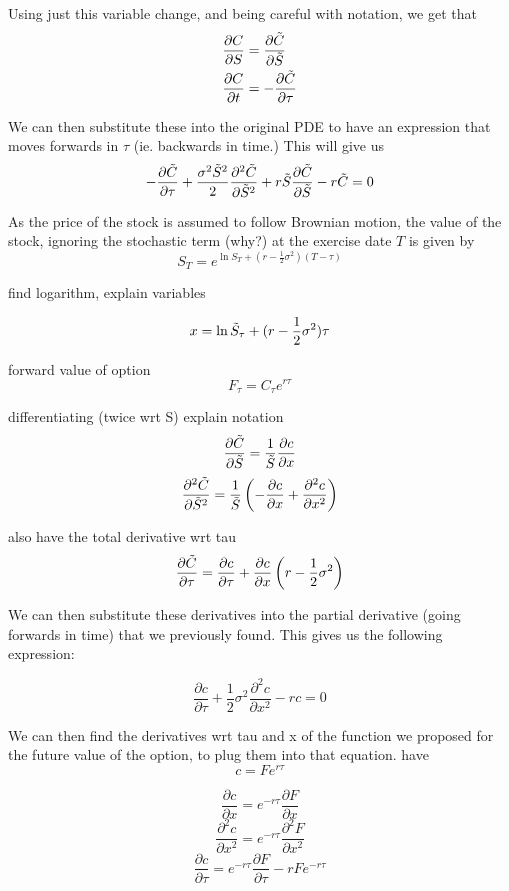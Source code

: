 \documentclass[11pt]{article}
\begin{document}
Using just this variable change, and being careful with notation, we get that
\begin{align*}
    \frac{\partial C}{\partial S} &= \frac{\partial \Tilde{C}}{\partial \Tilde{S}} \\
    \frac{\partial C}{\partial t} &= -\frac{\partial \Tilde{C}}{\partial \tau}
\end{align*}

We can then substitute these into the original PDE to have an expression that moves forwards in $\tau$ (ie. backwards in time.) This will give us
\[
- \frac{\partial \Tilde{C}}{\partial \tau} + \frac{\sigma^2 \Tilde{S}^2}{2} \frac{\partial^2 \Tilde{C}}{\partial \Tilde{S}^2} + r \Tilde{S} \frac{\partial \Tilde{C}}{\partial \Tilde{S}} - r \Tilde{C} = 0
\]

As the price of the stock is assumed to follow Brownian motion, the value of the stock, ignoring the stochastic term (why?) at the exercise date $T$ is given by
\[
S_T = e^{\ln{S_T}+(r-\frac{1}{2}\sigma^2)(T-\tau) }
\]

find logarithm, explain variables

\[
x = \ln{\Tilde{S}_\tau} + (r-\frac{1}{2} \sigma^2)\tau
\]

forward value of option 
\[
F_\tau = C_\tau e^{r\tau}
\]

differentiating (twice wrt S)
explain notation
\[
\frac{\partial \Tilde{C}}{\partial \Tilde{S}} = \frac{1}{\Tilde{S}}\frac{\partial c}{\partial x}
\]
\[
\frac{\partial^2 \Tilde{C}}{\partial \Tilde{S}^2} = \frac{1}{\Tilde{S}} \left( -\frac{\partial c}{\partial x} + \frac{\partial^2 c}{\partial x^2}\right)
\]

also have the total derivative wrt tau
\[
\frac{\partial \Tilde{C}}{\partial \tau} = \frac{\partial c}{\partial \tau} + \frac{\partial c}{\partial x}\left( r - \frac{1}{2}\sigma^2 \right)
\]

We can then substitute these derivatives into the partial derivative (going forwards in time) that we previously found. This gives us the following expression:

\[
\frac{\partial c}{\partial \tau} + \frac{1}{2} \sigma^2 \frac{\partial^2 c}{\partial x^2} - rc = 0
\]

We can then find the derivatives wrt tau and x of the function we proposed for the future value of the option, to plug them into that equation.
have
\[
c = Fe^{r \tau}
\]

\[
\frac{\partial c}{\partial x} = e^{-r \tau} \frac{\partial F}{\partial x}
\]
\[
\frac{\partial^2 c}{\partial x^2} = e^{-r \tau} \frac{\partial^2 F}{\partial x^2}
\]
\[
\frac{\partial c}{\partial \tau} = e^{-r \tau}\frac{\partial F}{\partial \tau} - r F e^{-r \tau}
\]
\end{document}
